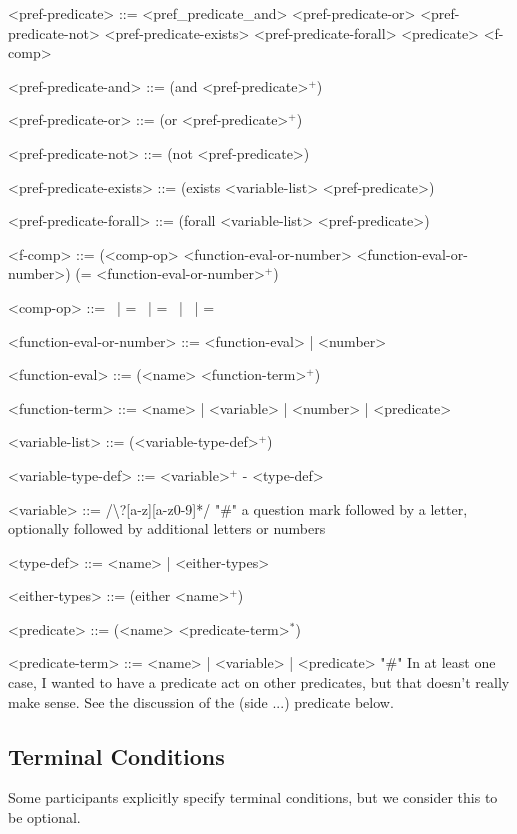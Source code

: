 \documentclass{article}
\begin{document}
\begin{grammar}
<pref-predicate> ::= <pref_predicate_and> \alt
    <pref-predicate-or> \alt
    <pref-predicate-not> \alt
    <pref-predicate-exists> \alt
    <pref-predicate-forall> \alt
    <predicate>
    <f-comp>

<pref-predicate-and> ::= (and <pref-predicate>$^+$)

<pref-predicate-or> ::= (or <pref-predicate>$^+$)

<pref-predicate-not> ::= (not <pref-predicate>)

<pref-predicate-exists> ::= (exists <variable-list> <pref-predicate>)

<pref-predicate-forall> ::= (forall <variable-list> <pref-predicate>)


<f-comp> ::= (<comp-op> <function-eval-or-number> <function-eval-or-number>) \alt
    (= <function-eval-or-number>$^+$)

<comp-op> ::=  \textlangle \ | \textlangle = \ | = \ | \textrangle \ | \textrangle =

<function-eval-or-number> ::= <function-eval> | <number>

<function-eval> ::= (<name> <function-term>$^+$)

<function-term> ::= <name> | <variable> | <number> | <predicate>

<variable-list> ::= (<variable-type-def>$^+$)

<variable-type-def> ::= <variable>$^+$ - <type-def>

<variable> ::= /\textbackslash?[a-z][a-z0-9]*/  "#" a question mark followed by a letter, optionally followed by additional letters or numbers

<type-def> ::= <name> | <either-types>

<either-types> ::= (either <name>$^+$)

<predicate> ::= (<name> <predicate-term>$^*$)

<predicate-term> ::= <name> | <variable> | <predicate> "#" In at least one case, I wanted to have a predicate act on other predicates, but that doesn't really make sense. See the discussion of the (side ...) predicate below.


\end{grammar}



\subsection{Terminal Conditions}
Some participants explicitly specify terminal conditions, but we consider this to be optional.
\end{document}
